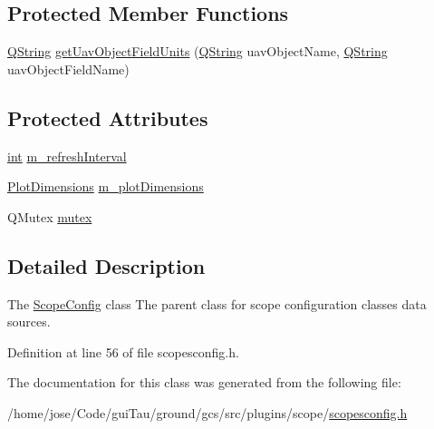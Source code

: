 \subsection*{Protected Member Functions}
\begin{DoxyCompactItemize}
\item 
\hyperlink{group___u_a_v_objects_plugin_gab9d252f49c333c94a72f97ce3105a32d}{Q\-String} \hyperlink{group___scope_plugin_gac9be5bd5f2a8394d4d2de1e8b6e9e382}{get\-Uav\-Object\-Field\-Units} (\hyperlink{group___u_a_v_objects_plugin_gab9d252f49c333c94a72f97ce3105a32d}{Q\-String} uav\-Object\-Name, \hyperlink{group___u_a_v_objects_plugin_gab9d252f49c333c94a72f97ce3105a32d}{Q\-String} uav\-Object\-Field\-Name)
\end{DoxyCompactItemize}
\subsection*{Protected Attributes}
\begin{DoxyCompactItemize}
\item 
\hyperlink{ioapi_8h_a787fa3cf048117ba7123753c1e74fcd6}{int} \hyperlink{group___scope_plugin_gab29cf33842cdb51f7eba8bfccc93158e}{m\-\_\-refresh\-Interval}
\item 
\hyperlink{group___scope_plugin_ga51d68dee7f98e408c8929a70cc78931d}{Plot\-Dimensions} \hyperlink{group___scope_plugin_ga5e011996b5bbb5da0ee8b193bb5073df}{m\-\_\-plot\-Dimensions}
\item 
Q\-Mutex \hyperlink{group___scope_plugin_ga482a0dd2b656ddf480def36bacca8aac}{mutex}
\end{DoxyCompactItemize}


\subsection{Detailed Description}
The \hyperlink{class_scope_config}{Scope\-Config} class The parent class for scope configuration classes data sources. 

Definition at line 56 of file scopesconfig.\-h.



The documentation for this class was generated from the following file\-:\begin{DoxyCompactItemize}
\item 
/home/jose/\-Code/gui\-Tau/ground/gcs/src/plugins/scope/\hyperlink{scopesconfig_8h}{scopesconfig.\-h}\end{DoxyCompactItemize}
